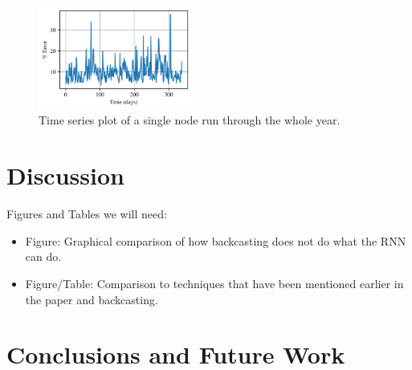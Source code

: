 \documentclass[sigconf]{acmart}
\begin{document}
\begin{figure}[h]
\includegraphics[width=0.45\textwidth]{fig_8.png}
\caption{Time series plot of a single node run through the whole year.}
\label{fig:time_single}
\end{figure}

\section{Discussion}
\label{sec:discussion}

Figures and Tables we will need:
\begin{itemize}
	\item Figure: Graphical comparison of how backcasting does not do what the RNN can do.
	\item Figure/Table: Comparison to techniques that have been mentioned earlier in the paper and backcasting.
\end{itemize}

\section{Conclusions and Future Work}
\label{sec:conclusions}

\end{document}
